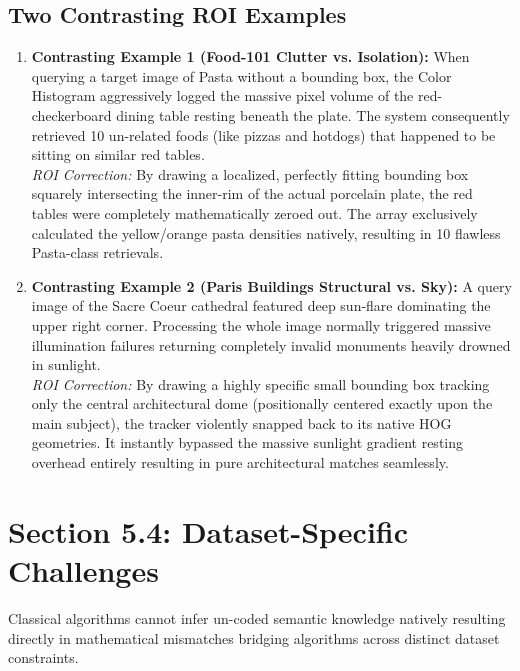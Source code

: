 \documentclass[11pt, a4paper]{article}
\begin{document}
\subsection{Two Contrasting ROI Examples}
\begin{enumerate}
    \item \textbf{Contrasting Example 1 (Food-101 Clutter vs. Isolation):} 
    When querying a target image of Pasta without a bounding box, the Color Histogram aggressively logged the massive pixel volume of the red-checkerboard dining table resting beneath the plate. The system consequently retrieved 10 un-related foods (like pizzas and hotdogs) that happened to be sitting on similar red tables. \\
    \textit{ROI Correction:} By drawing a localized, perfectly fitting bounding box squarely intersecting the inner-rim of the actual porcelain plate, the red tables were completely mathematically zeroed out. The array exclusively calculated the yellow/orange pasta densities natively, resulting in 10 flawless Pasta-class retrievals.
    
    \item \textbf{Contrasting Example 2 (Paris Buildings Structural vs. Sky):} 
    A query image of the Sacre Coeur cathedral featured deep sun-flare dominating the upper right corner. Processing the whole image normally triggered massive illumination failures returning completely invalid monuments heavily drowned in sunlight. \\
    \textit{ROI Correction:} By drawing a highly specific small bounding box tracking only the central architectural dome (positionally centered exactly upon the main subject), the tracker violently snapped back to its native HOG geometries. It instantly bypassed the massive sunlight gradient resting overhead entirely resulting in pure architectural matches seamlessly.
\end{enumerate}

\newpage
\section{Section 5.4: Dataset-Specific Challenges}
Classical algorithms cannot infer un-coded semantic knowledge natively resulting directly in mathematical mismatches bridging algorithms across distinct dataset constraints.
\end{document}

